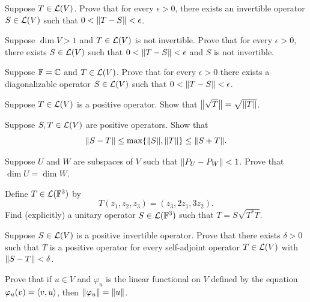 \begin{exc}
\begin{exercise}
Suppose $T\in\mathcal{L}(V)$. Prove that for every $\epsilon>0$, there exists an
invertible operator $S\in\mathcal{L}(V)$ such that $0<\lVert T-S \rVert<\epsilon$.
\end{exercise}

\begin{exercise}
Suppose $\dim V>1$ and $T\in\mathcal{L}(V)$ is not invertible. Prove that for every
$\epsilon>0$, there exists $S\in\mathcal{L}(V)$ such that $0<\lVert T-S \rVert<\epsilon$ and
$S$ is not invertible.
\end{exercise}

\begin{exercise}
Suppose $\mathbb{F}=\mathbb{C}$ and $T\in\mathcal{L}(V)$. Prove that for every $\epsilon>0$ there
exists a diagonalizable operator $S\in\mathcal{L}(V)$ such that
$0<\lVert T-S \rVert<\epsilon$.
\end{exercise}

\begin{exercise}
Suppose $T\in\mathcal{L}(V)$ is a positive operator. Show that
$\bigl\lVert\sqrt{T}\bigr\rVert=\sqrt{\lVert T \rVert}$.
\end{exercise}

\begin{exercise}
Suppose $S,T\in\mathcal{L}(V)$ are positive operators. Show that
\[ \lVert S-T \rVert\le\max\{\lVert S \rVert,\lVert T \rVert\}\le\lVert S+T \rVert. \]
\end{exercise}

\begin{exercise}
Suppose $U$ and $W$ are subspaces of $V$ such that $\lVert P_U-P_W \rVert<1$. Prove
that $\dim U=\dim W$.
\end{exercise}

\begin{exercise}
Define $T\in\mathcal{L}(\mathbb{F}^3)$ by
\[ T(z_1,z_2,z_3) = (z_3,2z_1,3z_2). \]
Find (explicitly) a unitary operator $S\in\mathcal{L}(\mathbb{F}^3)$ such that
$T=S\sqrt{T^*T}$.
\end{exercise}

\begin{exercise}
Suppose $S\in\mathcal{L}(V)$ is a positive invertible operator. Prove that there
exists $\delta>0$ such that $T$ is a positive operator for every self-adjoint
operator $T\in\mathcal{L}(V)$ with $\lVert S-T \rVert<\delta$.
\end{exercise}

\begin{exercise}
Prove that if $u\in V$ and $\varphi_u$ is the linear functional on $V$ defined
by the equation $\varphi_u(v)=\langle v, u \rangle$, then $\lVert \varphi_u \rVert=\lVert u \rVert$.
\end{exercise}


\end{exc}
